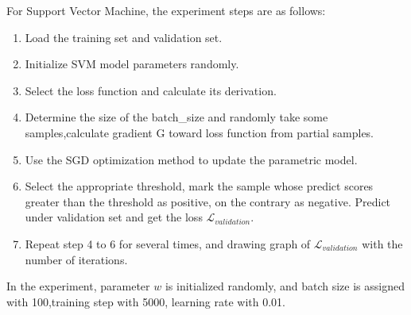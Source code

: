 \documentclass[journal, a4paper]{IEEEtran}
\begin{document}
For Support Vector Machine, the experiment steps are as follows:
\begin{enumerate}
  \item Load the training set and validation set.
  \item Initialize SVM model parameters randomly.
  \item Select the loss function and calculate its derivation.
  \item Determine the size of the batch\_size and randomly take some samples,calculate gradient G toward loss function from partial samples.
  \item Use the SGD optimization method to update the parametric model.
  \item Select the appropriate threshold, mark the sample whose predict scores greater than the threshold as positive, on the contrary as negative. Predict under validation set and get the loss $\mathcal{L}_{validation}$.
  \item Repeat step 4 to 6 for several times, and drawing graph of $\mathcal{L}_{validation}$ with the number of iterations.
\end{enumerate}

In the experiment, parameter $w$ is initialized randomly, and batch size is assigned with 100,training step with 5000, learning rate with 0.01.
\end{document}
